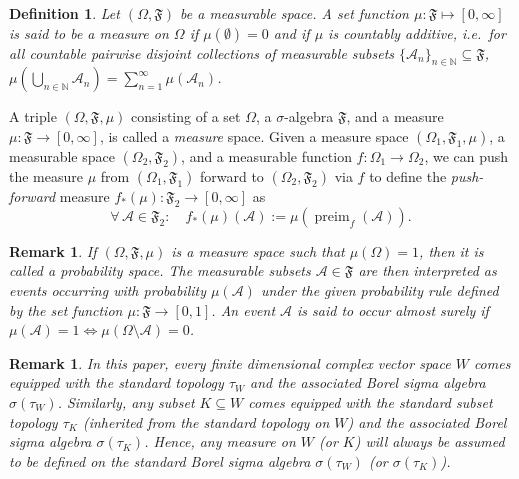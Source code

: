 \documentclass[a4paper,onecolumn,10pt,accepted=2022-07-11]{quantumarticle}
\newtheorem{definition}[theorem]{Definition}
\newtheorem{remark}[theorem]{Remark}
\theoremstyle{definition}
\begin{document}
\begin{definition}
Let $(\Omega,\mathfrak{F})$ be a measurable space. A set function $\mu : \mathfrak{F}\mapsto [0,\infty]$ is said to be a \emph{measure} on $\Omega$ if $\mu (\emptyset) = 0$ and if $\mu$ is \emph{countably additive}, i.e.~for all countable pairwise disjoint collections of measurable subsets $\{\mathcal{A}_n\}_{n\in \mathbb{N}}\subseteq \mathfrak{F}$, $\mu (\bigcup_{n\in \mathbb{N}} \mathcal{A}_n ) = \sum_{n=1}^\infty \mu (\mathcal{A}_n)$.
\end{definition}

A triple $(\Omega,\mathfrak{F},\mu)$ consisting of a set $\Omega$, a $\sigma$-algebra $\mathfrak{F}$, and a measure $\mu:\mathfrak{F}\to [0,\infty]$, is called a \emph{measure} space. Given a measure space $(\Omega_1,\mathfrak{F}_1,\mu)$, a measurable space $(\Omega_2,\mathfrak{F}_2)$, and a measurable function $f:\Omega_1\to \Omega_2$, we can push the measure $\mu$ from $(\Omega_1,\mathfrak{F}_1)$ forward to $(\Omega_2,\mathfrak{F}_2)$ via $f$ to define the \emph{push-forward} measure $f_*(\mu):\mathfrak{F}_2\to [0,\infty]$ as
\begin{equation}
   \forall \, \mathcal{A}\in \mathfrak{F}_2: \quad f_*(\mu)(\mathcal{A}) := \mu (\operatorname{preim}_f (\mathcal{A})).
\end{equation}


\begin{remark}\label{remark:prob}
If $(\Omega,\mathfrak{F},\mu)$ is a measure space such that $\mu(\Omega)=1$, then it is called a \emph{probability} space. The measurable subsets $\mathcal{A}\in\mathfrak{F}$ are then interpreted as \emph{events} occurring with probability $\mu(\mathcal{A})$ under the given probability rule defined by the set function $\mu:\mathfrak{F}\to [0,1]$. An event $\mathcal{A}$ is said to occur \emph{almost surely} if $\mu(\mathcal{A})=1\iff \mu(\Omega\setminus \mathcal{A})=0$.
\end{remark}

\begin{remark}\label{remark:assume}
In this paper, every finite dimensional complex vector space $W$ comes equipped with the standard topology $\tau_W$ and the associated Borel sigma algebra $\sigma(\tau_W)$. Similarly, any subset $K\subseteq W$ comes equipped with the standard subset topology $\tau_K$ (inherited from the standard topology on $W$) and the associated Borel sigma algebra $\sigma(\tau_K)$. Hence, any measure on $W$ (or $K$) will always be assumed to be defined on the standard Borel sigma algebra $\sigma(\tau_W)$ (or $\sigma(\tau_K)$).
\end{remark}
\end{document}
